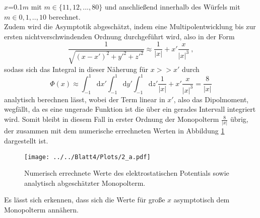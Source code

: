 $x$=0.1$m$ mit $m\in\{11,12,...,80\}$ und anschließend innerhalb des Würfels mit $m\in{0,1,..,10}$ berechnet.\\ Zudem wird die Asymptotik abgeschätzt, indem eine Multipolentwicklung bis zur ersten nichtverschwindenden Ordnung durchgeführt wird, also in der Form
\begin{equation}
  \frac{1}{\sqrt{(x-x')^2+y'^2+z'^2}}\approx \frac{1}{\lvert x \rvert}+ x'\frac{x}{\lvert x \rvert^3} \: ,
\end{equation}
sodass sich das Integral in dieser Näherung für $x>>x'$ durch
\begin{equation}
  \Phi(x)\approx\int_{-1}^{1}\text{d}x'\int_{-1}^{1}\text{d}y'\int_{-1}^{1}\text{d}z'\frac{1}{\lvert x \rvert}+x'\frac{x}{\lvert x \rvert^3} = \frac{8}{\lvert x \rvert}
\end{equation}
analytisch berechnen lässt, wobei der Term linear in $x'$, also das Dipolmoment, wegfällt, da es eine ungerade Funktion ist die über ein gerades Intervall integriert wird. Somit bleibt in diesem Fall in erster Ordnung der Monopolterm $\frac{8}{\lvert x \rvert}$ übrig, der zusammen mit dem numerische errechneten Werten in Abbildung \ref{fig:Phi_a} dargestellt ist.
\begin{figure}[H]
  \texttt{[image: ../../Blatt4/Plots/2\_a.pdf]}
  \caption{Numerisch errechnete Werte des elektrostatischen Potentials sowie analytisch abgeschätzter Monopolterm.}
  \label{fig:Phi_a}
\end{figure}
Es lässt sich erkennen, dass sich die Werte für große $x$ asymptotisch dem Monopolterm annähern.


